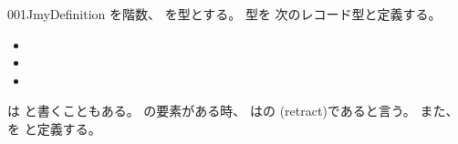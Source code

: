 \documentclass[index]{subfiles}
\begin{document}
\begin{myBlock}{001J}{myDefinition}
  を階数、
  を型とする。
  型を
  次のレコード型と定義する。
  \begin{itemize}
    \item {}
    \item {}
    \item {}
  \end{itemize}
  は
  と書くこともある。
  の要素がある時、
  はの
  (retract)であると言う。
  また、を
  と定義する。
\end{myBlock}
\end{document}
